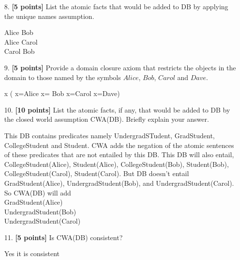 \documentclass{article}
\begin{document}
\begin{enumerate}

\item[8.] {\textbf{[5 points]}} List the atomic facts that would be added
  to DB by applying the unique names assumption.
  \begin{answer}
Alice \neq Bob\\
Alice \neq Carol\\
Carol \neq Bob
  \end{answer}

\item[9.] {\textbf{[5 points]}} Provide a domain closure axiom that
  restricts the objects in the domain to those named by the symbols
  $Alice$, $Bob$, $Carol$ and $Dave$.
\begin{answer}
\forall x ( x=Alice \lor x= Bob \lor x=Carol \lor x=Dave)
\end{answer}
\item[10.] {\textbf{[10 points]}} List the atomic facts, if any, that
  would be added to DB by the closed world assumption CWA(DB).
  Briefly explain your answer.
\begin{answer}
This DB contains predicates namely UndergradSTudent, GradStudent, CollegeStudent and Student. CWA adds the negation of the atomic sentences of these predicates that are not entailed by this DB. This DB will also entail, CollegeStudent(Alice), Student(Alice), CollegeStudent(Bob), Student(Bob), CollegeStudent(Carol), Student(Carol). But DB doesn't entail GradStudent(Alice), UndergradStudent(Bob), and UndergradStudent(Carol). So CWA(DB) will add\\
\neg GradStudent(Alice)\\
\neg UndergradStudent(Bob)\\
\neg UndergradStudent(Carol)
\end{answer}
\item[11.] {\textbf{[5 points]}} Is CWA(DB) consistent?
\begin{answer}
Yes it is consistent
\end{answer}
\end{enumerate}
\end{document}
